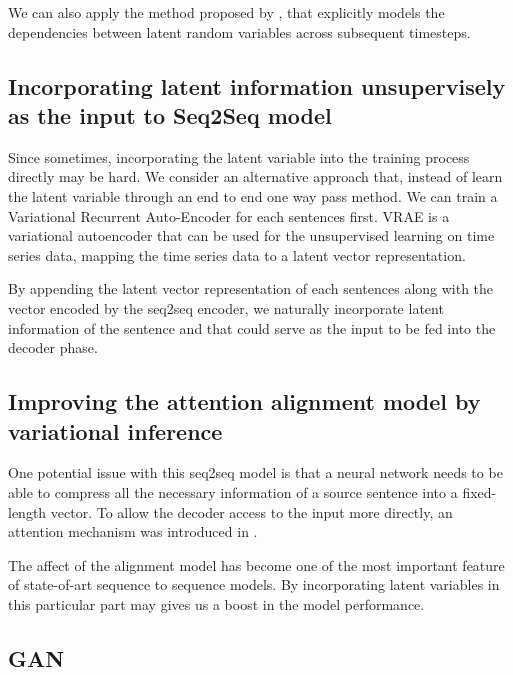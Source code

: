 \documentclass{article}
\begin{document}
We can also apply the method proposed by \cite{vrnn}, that explicitly models the dependencies between latent random variables across subsequent timesteps.

\subsection{Incorporating latent information unsupervisely as the input to Seq2Seq model}
Since sometimes, incorporating the latent variable into the training process directly may be hard. We consider an alternative approach that, instead of learn the latent variable through an end to end one way pass method. We can train a Variational Recurrent Auto-Encoder \cite{vrae} for each sentences first. VRAE is a variational autoencoder that can be used for the unsupervised learning on time series data, mapping the time series data to a latent vector representation. 

By appending the latent vector representation of each sentences along with the vector encoded by the seq2seq encoder, we naturally incorporate latent information of the sentence and that could serve as the input to be fed into the decoder phase.

\subsection{Improving the attention alignment model by variational inference }

One potential issue with this seq2seq model is that a neural network needs to be able to compress all the necessary information of a source sentence into a fixed-length vector. To allow the decoder access to the input more directly, an attention mechanism was introduced in \cite{attention}.

The affect of the alignment model has become one of the most important feature of state-of-art sequence to sequence models. By incorporating latent variables in this particular part may gives us a boost in the model performance.

\subsection{GAN}




\end{document}
